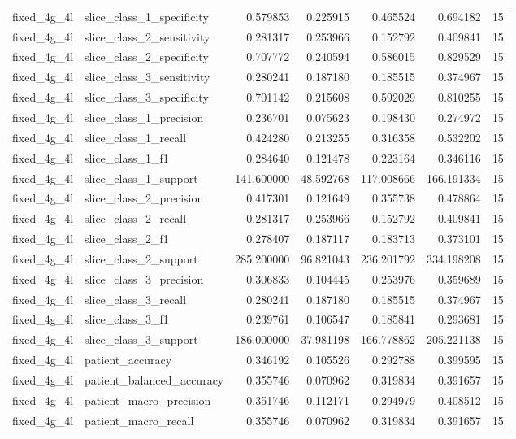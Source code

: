 \begin{tabular}{llrrrrr}
fixed_4g_4l & slice_class_1_specificity & 0.579853 & 0.225915 & 0.465524 & 0.694182 & 15 \\
fixed_4g_4l & slice_class_2_sensitivity & 0.281317 & 0.253966 & 0.152792 & 0.409841 & 15 \\
fixed_4g_4l & slice_class_2_specificity & 0.707772 & 0.240594 & 0.586015 & 0.829529 & 15 \\
fixed_4g_4l & slice_class_3_sensitivity & 0.280241 & 0.187180 & 0.185515 & 0.374967 & 15 \\
fixed_4g_4l & slice_class_3_specificity & 0.701142 & 0.215608 & 0.592029 & 0.810255 & 15 \\
fixed_4g_4l & slice_class_1_precision & 0.236701 & 0.075623 & 0.198430 & 0.274972 & 15 \\
fixed_4g_4l & slice_class_1_recall & 0.424280 & 0.213255 & 0.316358 & 0.532202 & 15 \\
fixed_4g_4l & slice_class_1_f1 & 0.284640 & 0.121478 & 0.223164 & 0.346116 & 15 \\
fixed_4g_4l & slice_class_1_support & 141.600000 & 48.592768 & 117.008666 & 166.191334 & 15 \\
fixed_4g_4l & slice_class_2_precision & 0.417301 & 0.121649 & 0.355738 & 0.478864 & 15 \\
fixed_4g_4l & slice_class_2_recall & 0.281317 & 0.253966 & 0.152792 & 0.409841 & 15 \\
fixed_4g_4l & slice_class_2_f1 & 0.278407 & 0.187117 & 0.183713 & 0.373101 & 15 \\
fixed_4g_4l & slice_class_2_support & 285.200000 & 96.821043 & 236.201792 & 334.198208 & 15 \\
fixed_4g_4l & slice_class_3_precision & 0.306833 & 0.104445 & 0.253976 & 0.359689 & 15 \\
fixed_4g_4l & slice_class_3_recall & 0.280241 & 0.187180 & 0.185515 & 0.374967 & 15 \\
fixed_4g_4l & slice_class_3_f1 & 0.239761 & 0.106547 & 0.185841 & 0.293681 & 15 \\
fixed_4g_4l & slice_class_3_support & 186.000000 & 37.981198 & 166.778862 & 205.221138 & 15 \\
fixed_4g_4l & patient_accuracy & 0.346192 & 0.105526 & 0.292788 & 0.399595 & 15 \\
fixed_4g_4l & patient_balanced_accuracy & 0.355746 & 0.070962 & 0.319834 & 0.391657 & 15 \\
fixed_4g_4l & patient_macro_precision & 0.351746 & 0.112171 & 0.294979 & 0.408512 & 15 \\
fixed_4g_4l & patient_macro_recall & 0.355746 & 0.070962 & 0.319834 & 0.391657 & 15 \\

\end{tabular}
